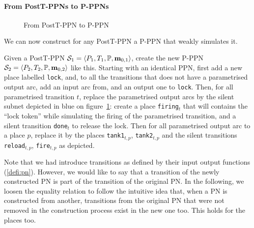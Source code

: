 
\paragraph{From PostT-PPNs to P-PPNs}
\label{sec:from-postt-ppn-to-p-ppn}

\begin{figure}[htbp]
  \centering
  
  \par
  \caption{From PostT-PPN to P-PPN}
  \label{fig:posttppn-to-pppn}
\end{figure}

We can now construct for any PostT-PPN a P-PPN that weakly simulates it.

Given a PostT-PPN $\namePPN[1] = \tuple{\places_1, \transitions_1, \parameters, \mar_{0,1}}$, create the new P-PPN $\namePPN[2] = \tuple{\places_2, \transitions_2, \parameters, \mar_{0,2}}$ like this.
Starting with an identical \ac{PPN}, first add a new place labelled \texttt{lock}, and, to all the transitions that does not have a parametrised output arc, add an input arc from, and an output one to \texttt{lock}.
Then, for all parametrised transition $t$, replace the parametrised output arcs by the silent subnet depicted in blue on figure~\ref{fig:posttppn-to-pppn}:
create a place \texttt{firing}$_t$ that will contains the ``lock token'' while simulating the firing of the parametrised transition, and a silent transition \texttt{done}$_t$ to release the lock.
Then for all parametrised output arc to a place $p$, replace it by the places \texttt{tank1}$_{t,p}$, \texttt{tank2}$_{t,p}$ and the silent transitions \texttt{reload}$_{t,p}$, \texttt{fire}$_{t,p}$ as depicted.

\begin{technical-note}
Note that we had introduce transitions as defined by their input output functions (\cref{defi:pn}).
However, we would like to say that a transition of the newly constructed PN is part of the transition of the original PN.
In the following, we loosen the equality relation to follow the intuitive idea that, when a PN is constructed from another, transitions from the original PN that were not removed in the construction process exist in the new one too.
This holds for the places too.
\end{technical-note}

